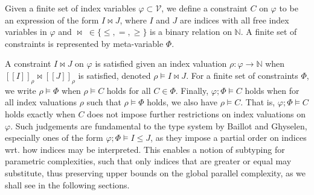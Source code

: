 \begin{defi}\label{def:indexconstr}
    Given a finite set of index variables $\varphi\subset \mathcal{V}$, we define a constraint $C$ on $\varphi$ to be an expression of the form $I \bowtie J$, where $I$ and $J$ are indices with all free index variables in $\varphi$ and $\bowtie\;\in\{\leq,=,\geq\}$ is a binary relation on $\mathbb{N}$. A finite set of constraints is represented by meta-variable $\Phi$.
\end{defi}
%
A constraint $I \bowtie J$ on $\varphi$ is satisfied given an index valuation $\rho : \varphi \longrightarrow \mathbb{N}$ when $[\![I]\!]_\rho \bowtie [\![J]\!]_\rho$ is satisfied, denoted $\rho \vDash I \bowtie J$. For a finite set of constraints $\Phi$, we write $\rho\vDash \Phi$ when $\rho \vDash C$ holds for all $C \in \Phi$. Finally, $\varphi;\Phi\vDash C$ holds when for all index valuations $\rho$ such that $\rho\vDash \Phi$ holds, we also have $\rho\vDash C$. That is, $\varphi;\Phi\vDash C$ holds exactly when $C$ does not impose further restrictions on index valuations on $\varphi$. Such judgements are fundamental to the type system by Baillot and Ghyselen, especially ones of the form $\varphi;\Phi\vDash I \leq J$, as they impose a partial order on indices wrt. how indices may be interpreted. This enables a notion of subtyping for parametric complexities, such that only indices that are greater or equal may substitute, thus preserving upper bounds on the global parallel complexity, as we shall see in the following sections.
%
%